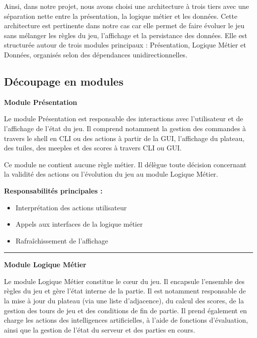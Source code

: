 \documentclass[11pt]{article}
\begin{document}
Ainsi, dans notre projet, nous avons choisi une architecture à trois tiers avec une séparation nette entre la présentation, la logique métier et les données.
Cette architecture est pertinente dans notre cas car elle permet de faire évoluer le jeu sans mélanger les règles du jeu, l’affichage et la persistance des données. Elle est structurée autour de trois modules principaux : Présentation, Logique Métier et Données, organisés selon des dépendances unidirectionnelles.

\subsection{Découpage en modules}

\begin{tcolorbox}[
  colback=gray!5,
  colframe=black,
  boxrule=0.8pt,
  arc=2mm
]
\large\textbf{Module Présentation}\normalsize
\vspace{0.3em}

Le module Présentation est responsable des interactions avec l’utilisateur et de l’affichage de l’état du jeu.
Il comprend notamment la gestion des commandes à travers le shell en CLI ou des actions à partir de la GUI, l’affichage du plateau, des tuiles, des meeples et des scores à travers CLI ou GUI.

Ce module ne contient aucune règle métier. Il délègue toute décision concernant la validité des actions ou l’évolution du jeu au module Logique Métier.

\vspace{0.5em}
\textbf{Responsabilités principales :}
\begin{itemize}
  \item[$\bullet$] Interprétation des actions utilisateur


  \item[$\bullet$] Appels aux interfaces de la logique métier


  \item[$\bullet$] Rafraîchissement de l’affichage
\end{itemize}

\medskip
\hrule
\medskip

\large\textbf{Module Logique Métier}\normalsize
\vspace{0.3em}

Le module Logique Métier constitue le cœur du jeu.
Il encapsule l’ensemble des règles du jeu et gère l’état interne de la partie.
Il est notamment responsable de la mise à jour du plateau (via une liste d’adjacence), du calcul des scores, de la gestion des tours de jeu et des conditions de fin de partie. 
Il prend également en charge les actions des intelligences artificielles, à l’aide de fonctions d’évaluation, ainsi que la gestion de l’état du serveur et des parties en cours.


\end{tcolorbox}
\end{document}
